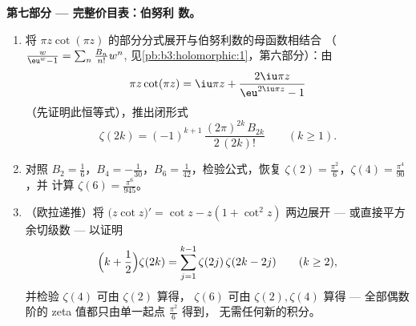 \begin{problem}
\begin{enumerate}[resume]
\end{enumerate}
\medskip
\noindent\textbf{第七部分 --- 完整价目表：伯努利
数。}
\begin{enumerate}[resume]
  \item 将 $\pi
        z\cot(\pi z)$ 的部分分式展开与伯努利数的母函数相结合
        （$\frac{w}{\eu^w - 1} =
        \sum_n\frac{B_n}{n!}w^n$,
        见\cref{pb:b3:holomorphic:1}，第六部分）：由
        \[
        \pi z\cot(\pi z) = \iu\pi z +
        \frac{2\iu\pi z}{\eu^{2\iu\pi z} - 1}
        \]
        （先证明此恒等式），推出闭形式
        \[
        \zeta(2k) = (-1)^{k+1}\,
        \frac{(2\pi)^{2k}\,B_{2k}}{2\,(2k)!}
        \qquad (k \geq 1).
        \]
  \item 对照 $B_2 = \frac16$，$B_4 =
        -\frac1{30}$，$B_6 = \frac1{42}$，检验公式，恢复 $\zeta(2) =
        \frac{\pi^2}6$，$\zeta(4) = \frac{\pi^4}{90}$，并
        计算 $\zeta(6) = \frac{\pi^6}{945}$。
  \item （欧拉递推）将
        $\bigl(z\cot z\bigr)' = \cot z - z(1 + \cot^2z)$ 两边展开 ---
        或直接平方余切级数 --- 以证明
        \[
        \Bigl(k + \frac12\Bigr)\zeta(2k) =
        \sum_{j=1}^{k-1}\zeta(2j)\,\zeta(2k - 2j)
        \qquad (k \geq 2),
        \]
        并检验 $\zeta(4)$ 可由 $\zeta(2)$ 算得，
        $\zeta(6)$ 可由 $\zeta(2), \zeta(4)$ 算得 --- 全部偶数
        阶的 zeta 值都只由单一起点 $\frac{\pi^2}6$ 得到，
        无需任何新的积分。
\end{enumerate}
\end{problem}
